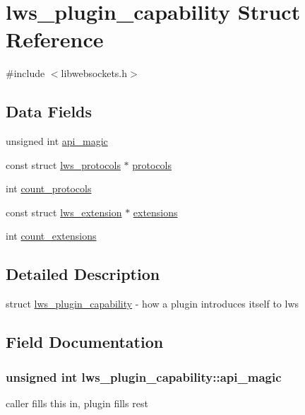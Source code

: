 \hypertarget{structlws__plugin__capability}{}\section{lws\+\_\+plugin\+\_\+capability Struct Reference}
\label{structlws__plugin__capability}


{\ttfamily \#include $<$libwebsockets.\+h$>$}

\subsection*{Data Fields}
\begin{DoxyCompactItemize}
\item 
unsigned int \hyperlink{structlws__plugin__capability_a523c7cde6f15bba345f56493dcf6b32a}{api\+\_\+magic}
\item 
const struct \hyperlink{structlws__protocols}{lws\+\_\+protocols} $\ast$ \hyperlink{structlws__plugin__capability_a6a4d9d01e770f378ddadc77b37522033}{protocols}
\item 
int \hyperlink{structlws__plugin__capability_ae38f7cf1246b9ca3af3cbf9d46b7090f}{count\+\_\+protocols}
\item 
const struct \hyperlink{structlws__extension}{lws\+\_\+extension} $\ast$ \hyperlink{structlws__plugin__capability_a7936f0eb93d79dea76b903d0f8a5f623}{extensions}
\item 
int \hyperlink{structlws__plugin__capability_abcf51db969522fdda9aaf902e65739d3}{count\+\_\+extensions}
\end{DoxyCompactItemize}


\subsection{Detailed Description}
struct \hyperlink{structlws__plugin__capability}{lws\+\_\+plugin\+\_\+capability} -\/ how a plugin introduces itself to lws 

\subsection{Field Documentation}
\subsubsection[{\texorpdfstring{api\+\_\+magic}{api\_magic}}]{\setlength{\rightskip}{0pt plus 5cm}unsigned int lws\+\_\+plugin\+\_\+capability\+::api\+\_\+magic}\hypertarget{structlws__plugin__capability_a523c7cde6f15bba345f56493dcf6b32a}{}\label{structlws__plugin__capability_a523c7cde6f15bba345f56493dcf6b32a}
caller fills this in, plugin fills rest 
